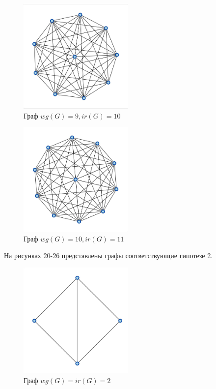 \documentclass[bachelor, och, nir]{SCWorks}
\begin{document}
\begin{figure}[ht!]  
    \centering 
    \includegraphics[width=0.5\textwidth]
{8.jpeg}  
    \caption{Граф $wg(G) = 9, ir(G) = 10$} 
    \label{fig:im2} 
\end{figure}


\begin{figure}[ht!]  
    \centering 
    \includegraphics[width=0.5\textwidth]
{9.jpeg}  
    \caption{Граф $wg(G) = 10, ir(G) = 11$} 
    \label{fig:im2} 
\end{figure}
\newpage
На рисунках 20-26 представлены графы соответствующие гипотезе 2.

\begin{figure}[ht!]  
    \centering 
    \includegraphics[width=0.5\textwidth]
{44.jpg}  
    \caption{Граф $wg(G) = ir(G) = 2$} 
    \label{fig:im3} 
\end{figure}
\end{document}
